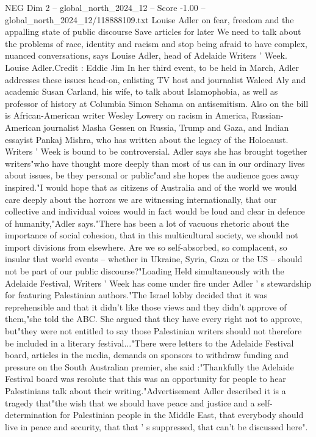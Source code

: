 \begin{textsample}{NEG Dim 2 – global\_north\_2024\_12 – Score -1.00 – global\_north\_2024\_12/118888109.txt}  \label{ex:f2_neg_164}
Louise Adler on fear, freedom and the appalling state of public discourse Save articles for later We need to talk about the problems of race, identity and racism and stop being afraid to have complex, nuanced conversations, says Louise Adler, head of Adelaide Writers ' Week.
Louise Adler.Credit : Eddie Jim In her third event, to be held in March, Adler addresses these issues head-on, enlisting TV host and journalist Waleed Aly and academic Susan Carland, his wife, to talk about Islamophobia, as well as professor of history at Columbia Simon Schama on antisemitism.
Also on the bill is African-American writer Wesley Lowery on racism in America, Russian-American journalist Masha Gessen on Russia, Trump and Gaza, and Indian essayist Pankaj Mishra, who has written about the legacy of the Holocaust.
Writers ' Week is bound to be controversial.
Adler says she has brought together writers"who have thought more deeply than most of us can in our ordinary lives about issues, be they personal or public"and she hopes the audience goes away inspired."I would hope that as citizens of Australia and of the world we would care deeply about the horrors we are witnessing internationally, that our collective and individual voices would in fact would be loud and clear in defence of humanity,"Adler says."There has been a lot of vacuous rhetoric about the importance of social cohesion, that in this multicultural society, we should not import divisions from elsewhere.
Are we so self-absorbed, so complacent, so insular that world events -- whether in Ukraine, Syria, Gaza or the US -- should not be part of our public discourse?"Loading Held simultaneously with the Adelaide Festival, Writers ' Week has come under fire under Adler ' s stewardship for featuring Palestinian authors."The Israel lobby decided that it was reprehensible and that it didn't like those views and they didn't approve of them,"she told the ABC.
She argued that they have every right not to approve, but"they were not entitled to say those Palestinian writers should not therefore be included in a literary festival..."There were letters to the Adelaide Festival board, articles in the media, demands on sponsors to withdraw funding and pressure on the South Australian premier, she said :"Thankfully the Adelaide Festival board was resolute that this was an opportunity for people to hear Palestinians talk about their writing."Advertisement Adler described it is a tragedy that"the wish that we should have peace and justice and a self-determination for Palestinian people in the Middle East, that everybody should live in peace and security, that that ' s suppressed, that can't be discussed here".

\end{textsample}
